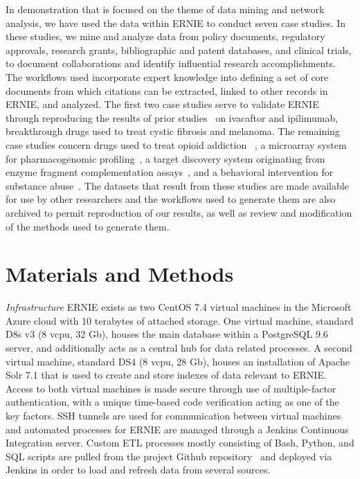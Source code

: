 \documentclass[review]{elsarticle}
\begin{document}
In demonstration that is focused on the theme of data mining and network analysis, we have used the data within ERNIE to conduct seven case studies. In these studies, we mine and analyze data from policy documents, regulatory approvals, research grants, bibliographic and patent databases, and clinical trials, to document collaborations and identify influential research accomplishments. The workflows used incorporate expert knowledge into defining a set of core documents from which citations can be extracted, linked to other records in ERNIE, and analyzed. The first two case studies serve to validate ERNIE through reproducing the results of prior studies~\cite{Williams2015} on ivacaftor and ipilimumab, breakthrough drugs used to treat cystic fibrosis and melanoma. The remaining case studies concern drugs used to treat opioid addiction~\cite{Blumberg1973,Cowan1977} , a microarray system for pharmacogenomic profiling~\cite{deLeon2006}, a target discovery system originating from enzyme fragment complementation assays~\cite{Khanna1989}, and a behavioral intervention for substance abuse~\cite{Botvin1980}. The datasets that result from these studies are made available for use by other researchers and the workflows used to generate them are also archived to permit reproduction of our results, as well as review and modification of the methods used to generate them. 

\section*{Materials and Methods}

\emph{Infrastructure} ERNIE exists as two CentOS 7.4 virtual machines in the Microsoft Azure cloud with 10 terabytes of attached storage. One virtual machine, standard D8s v3 (8 vcpu, 32 Gb), houses the main database within a PostgreSQL 9.6 server, and additionally acts as a central hub for data related processes. A second virtual machine, standard DS4 (8 vcpu, 28 Gb), houses an installation of Apache Solr 7.1 that is used to create and store indexes of data relevant to ERNIE. Access to both virtual machines is made secure through use of multiple-factor authentication, with a unique time-based code verification acting as one of the key factors. SSH tunnels are used for communication between virtual machines and automated processes for ERNIE are managed through a Jenkins Continuous Integration server. Custom ETL processes mostly consisting of Bash, Python, and SQL scripts are pulled from the project Github repository~\cite{GithubERNIE2017} and deployed via Jenkins in order to load and refresh data from several sources.  
\end{document}
